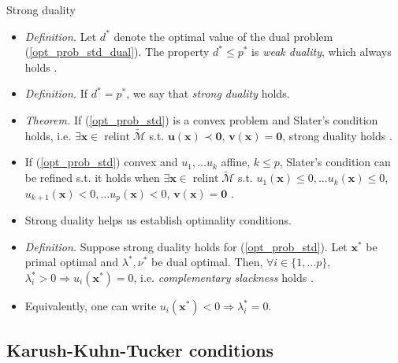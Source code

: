 \documentclass{beamer}
\numberwithin{equation}{section}
\newcommand{\aref}[1]{\alert{\ref{#1}}}
\begin{document}
\begin{frame}{Strong duality}
    \begin{itemize}
        \item
        \textit{Definition.} Let $ d^* $ denote the optimal value of the dual
        problem (\aref{opt_prob_std_dual}). The property $ d^* \le p^* $ is
        \textit{weak duality}, which always holds \cite{bv_convex_opt}.

        \item
        \textit{Definition.} If $ d^* = p^* $, we say that
        \textit{strong duality} holds.

        \item
        \textit{Theorem.} If (\aref{opt_prob_std}) is a convex problem and
        Slater's condition holds, i.e. $ \exists \mathbf{x} \in
        \operatorname{relint}\tilde{\mathcal{M}} $ s.t.
        $ \mathbf{u}(\mathbf{x}) \prec \mathbf{0} $,
        $ \mathbf{v}(\mathbf{x}) = \mathbf{0} $, strong duality holds
        \cite{bv_convex_opt}.

        \item
        If (\aref{opt_prob_std}) convex and $ u_1, \ldots u_k $ affine,
        $ k \le p $, Slater's condition can be refined s.t. it holds when
        $ \exists \mathbf{x} \in
        \operatorname{relint}\tilde{\mathcal{M}} $ s.t.
        $ u_1(\mathbf{x}) \le 0, \ldots u_k(\mathbf{x}) \le 0 $,
        $ u_{k + 1}(\mathbf{x}) < 0, \ldots u_p(\mathbf{x}) < 0 $,
        $ \mathbf{v}(\mathbf{x}) = \mathbf{0} $ \cite{bv_convex_opt}.

        \item
        Strong duality helps us establish optimality conditions.

        \item
        \textit{Definition.} Suppose strong duality holds for
        (\aref{opt_prob_std}). Let $ \mathbf{x}^* $ be primal optimal and
        $ \lambda^*, \nu^* $ be
        dual optimal. Then, $ \forall i \in \{1, \ldots p\} $,
        $ \lambda_i^* > 0 \Rightarrow u_i(\mathbf{x}^*) = 0 $, i.e.
        \textit{complementary slackness} holds \cite{bv_convex_opt}.

        \item
        Equivalently, one can write $ u_i(\mathbf{x}^*) < 0 \Rightarrow
        \lambda_i^* = 0 $.
    \end{itemize}
\end{frame}

\subsection{Karush-Kuhn-Tucker conditions}
\end{document}
